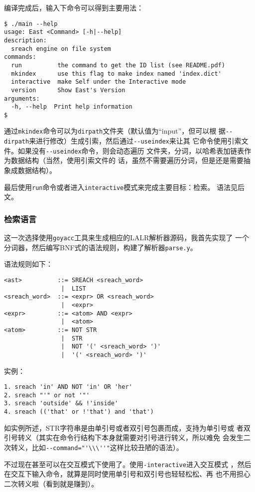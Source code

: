 \documentclass{peterlitsdoc}
\begin{document}
编译完成后，输入下命令可以得到主要用法：
\begin{lstlisting}
$ ./main --help
usage: East <Command> [-h|--help]
description:
  sreach engine on file system
commands:
  run          the command to get the ID list (see README.pdf)
  mkindex      use this flag to make index named 'index.dict'
  interactive  make Self under the Interactive mode
  version      Show East's Version
arguments:
  -h, --help  Print help information
$
\end{lstlisting}

通过\verb|mkindex|命令可以为\verb|dirpath|文件夹（默认值为``input''，但可以根
据\verb|--dirpath|来进行修改）生成引索，然后通过\verb|--useindex|来让其
它命令使用引索文件。如果没有\verb|--useindex|命令，则会动态遍历
文件夹，分词，以哈希表加链表作为数据结构（当然，使用引索文件的
话，虽然不需要遍历分词，但是还是需要抽象成数据结构）。

最后使用\verb|run|命令或者进入\verb|interactive|模式来完成主要目标：检索。
语法见后文。

\subsubsection{检索语言}

这一次选择使用\verb|goyacc|工具来生成相应的LALR解析器源码，我首先实现了
一个分词器，然后编写BNF式的语法规则，构建了解析器\verb|parse.y|。

语法规则如下：
\begin{lstlisting}
<ast>          ::= SREACH <sreach_word>
                |  LIST
<sreach_word>  ::= <expr> OR <sreach_word>
                |  <expr>
<expr>         ::= <atom> AND <expr>
                |  <atom>
<atom>         ::= NOT STR
                |  STR
                |  NOT '(' <sreach_word> ')'
                |  '(' <sreach_word> ')'
\end{lstlisting}

实例：
\begin{lstlisting}
1. sreach 'in' AND NOT 'in' OR 'her'
2. sreach "'" or not '"'
3. sreach 'outside' && !'inside'
4. sreach (('that' or !'that') and 'that')
\end{lstlisting}

如实例所述，STR字符串是由单引号或者双引号包裹而成，支持为单引号或
者双引号转义（其实在命令行结构下本身就需要对引号进行转义，所以难免
会发生二次转义，比如\verb|--command="'\\\''"|这样比较丑陋的语法）。

不过现在甚至可以在交互模式下使用了。使用\verb|-interactive|进入交互模式
，然后在交互下输入命令，就算是同时使用单引号和双引号也轻轻松松、再
也不用担心二次转义啦（看到就是赚到）。
\end{document}
